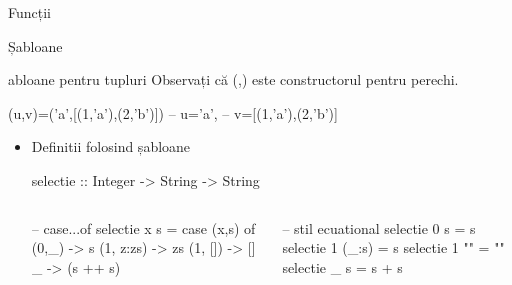 \documentclass[xcolor=pdftex,romanian,colorlinks]{beamer}
\begin{document}
\begin{section}{Funcții}
\begin{subsection}{Șabloane}
\begin{frame}[fragile]{\Sh abloane pentru tupluri}
  Observați că (,) este constructorul pentru perechi.
  
  \begin{asciihs}
  (u,v)=('a',[(1,'a'),(2,'b')]) -- u='a',
                                -- v=[(1,'a'),(2,'b')]
  \end{asciihs}
  \begin{itemize}
  \pause
  
  \item Definitii folosind șabloane
  \begin{asciihs}
  selectie :: Integer -> String -> String
  \end{asciihs}
  \vspace{-2ex}
  \begin{columns}[t]
    \begin{column}{.45\columnwidth}
  \begin{asciihs}
  -- case...of
  selectie x s =
      case (x,s) of
          (0,_) -> s
          (1, z:zs) -> zs
          (1, []) -> []
          _ -> (s ++ s)
  \end{asciihs}
    \end{column}
    \begin{column}{.45\columnwidth}
  \begin{asciihs}
  -- stil ecuational
  selectie 0 s = s
  selectie 1 (_:s) = s
  selectie 1 "" = ""
  selectie _ s = s + s
  \end{asciihs}
    \end{column}
  \end{columns}
  
  \end{itemize}
  \end{frame}
  
\end{subsection}

\end{section}
\end{document}
